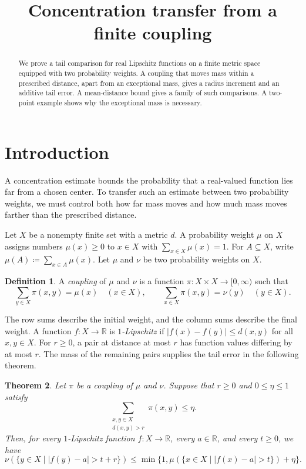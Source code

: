 \documentclass[a4paper,11pt]{article}
\title{Concentration transfer from a finite coupling}
\author{}
\date{}
\newtheorem{theorem}{Theorem}[section]
\theoremstyle{definition}
\newtheorem{definition}[theorem]{Definition}
\theoremstyle{remark}
\begin{document}
\maketitle

\begin{abstract}
We prove a tail comparison for real Lipschitz functions on a finite metric space equipped with two probability weights. A coupling that moves mass within a prescribed distance, apart from an exceptional mass, gives a radius increment and an additive tail error. A mean-distance bound gives a family of such comparisons. A two-point example shows why the exceptional mass is necessary.
\end{abstract}

\section{Introduction}

A concentration estimate bounds the probability that a real-valued function lies far from a chosen center. To transfer such an estimate between two probability weights, we must control both how far mass moves and how much mass moves farther than the prescribed distance.

Let $X$ be a nonempty finite set with a metric $d$. A probability weight $\mu$ on $X$ assigns numbers $\mu(x)\geq0$ to $x\in X$ with $\sum_{x\in X}\mu(x)=1$. For $A\subseteq X$, write $\mu(A)\coloneqq\sum_{x\in A}\mu(x)$. Let $\mu$ and $\nu$ be two probability weights on $X$.

\begin{definition}
A \emph{coupling} of $\mu$ and $\nu$ is a function $\pi\colon X\times X\to[0,\infty)$ such that
\[ \sum_{y\in X}\pi(x,y)=\mu(x)\quad(x\in X),\qquad \sum_{x\in X}\pi(x,y)=\nu(y)\quad(y\in X). \]
\end{definition}

The row sums describe the initial weight, and the column sums describe the final weight. A function $f\colon X\to\mathbb R$ is \emph{$1$-Lipschitz} if $|f(x)-f(y)|\leq d(x,y)$ for all $x,y\in X$. For $r\geq0$, a pair at distance at most $r$ has function values differing by at most $r$. The mass of the remaining pairs supplies the tail error in the following theorem.

\begin{theorem}\label{thm:transfer}
Let $\pi$ be a coupling of $\mu$ and $\nu$. Suppose that $r\geq0$ and $0\leq\eta\leq1$ satisfy
\[ \sum_{\substack{x,y\in X\\d(x,y)>r}}\pi(x,y)\leq\eta. \]
Then, for every $1$-Lipschitz function $f\colon X\to\mathbb R$, every $a\in\mathbb R$, and every $t\geq0$, we have
\[ \nu(\{y\in X\mid |f(y)-a|>t+r\})\leq\min\{1,\mu(\{x\in X\mid |f(x)-a|>t\})+\eta\}. \]
\end{theorem}
\end{document}
